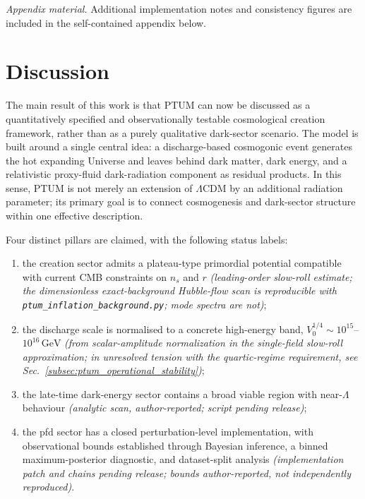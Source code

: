 \documentclass[epj]{svjour}
\begin{document}
\begin{center}
\textit{Appendix material.} Additional implementation notes and
consistency figures are included in the self-contained appendix below.
\end{center}

\section{Discussion}
\label{sec:discussion}

The main result of this work is that PTUM can now be discussed as a
quantitatively specified and observationally testable cosmological
creation framework, rather than as a purely qualitative dark-sector
scenario. The model is built around a single central idea: a
discharge-based cosmogonic event generates the hot expanding
Universe and leaves behind dark matter, dark energy, and a
relativistic proxy-fluid dark-radiation component as residual
products. In this sense, PTUM is not merely an extension of
$\Lambda$CDM by an additional radiation parameter; its primary goal
is to connect cosmogenesis and dark-sector structure within one
effective description.

Four distinct pillars are claimed, with the following status labels:
\begin{enumerate}[label=(\roman*)]
\item the creation sector admits a plateau-type primordial potential
      compatible with current CMB constraints on $n_s$ and $r$
      \emph{(leading-order slow-roll estimate; the dimensionless
      exact-background Hubble-flow scan is reproducible with
      \texttt{ptum\_inflation\_background.py}; mode spectra are not)};
\item the discharge scale is normalised to a concrete high-energy
      band, $V_0^{1/4}\sim10^{15}$--$10^{16}\,\mathrm{GeV}$
      \emph{(from scalar-amplitude normalization in the single-field
      slow-roll approximation; in unresolved tension
      with the quartic-regime requirement, see Sec.~\ref{subsec:ptum_operational_stability})};
\item the late-time dark-energy sector contains a broad viable
      region with near-$\Lambda$ behaviour
      \emph{(analytic scan, author-reported; script pending release)};
\item the pfd sector has a closed perturbation-level
      implementation, with observational bounds established through
      Bayesian inference, a binned maximum-posterior diagnostic, and
      dataset-split analysis
      \emph{(implementation patch and chains pending release;
      bounds author-reported, not independently reproduced)}.
\end{enumerate}
\end{document}
